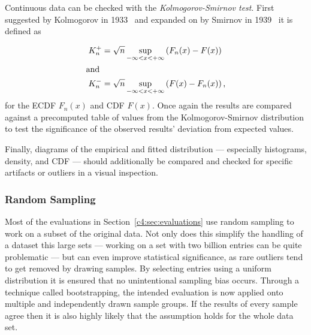 Continuous data can be checked with the \textit{Kolmogorov-Smirnov test}. First suggested by Kolmogorov in 1933~\cite{kolmogorov1933sulla} and expanded on by Smirnov in 1939~\cite{smirnov1939estimation} it is defined as

\begin{align}
	K_n^+ &= \sqrt{n} \sup_{-\infty < x < + \infty} \left( F_n(x) - F(x) \right) \\
	\shortintertext{and}
	\phantom{,}K_n^- &= \sqrt{n} \sup_{-\infty < x < + \infty} \left( F(x) - F_n(x) \right)\text{,}
\end{align}
%
for the \gls{ECDF} $F_n(x)$ and \gls{CDF} $F(x)$. Once again the results are compared against a precomputed table of values from the Kolmogorov-Smirnov distribution to test the significance of the observed results' deviation from expected values. 

Finally, diagrams of the empirical and fitted distribution --- especially histograms, density, and \gls{CDF} --- should additionally be compared and checked for specific artifacts or outliers in a visual inspection. 



\subsubsection{Random Sampling}

Most of the evaluations in Section~\ref{c4:sec:evaluations} use random sampling to work on a subset of the original data.  Not only does this simplify the handling of a dataset this large sets --- working on a set with two billion entries can be quite problematic --- but can even improve statistical significance, as rare outliers tend to get removed by drawing samples. By selecting entries using a uniform distribution it is ensured that no unintentional sampling bias occurs. Through a technique called bootstrapping, the intended evaluation is now applied onto multiple and independently drawn sample groups. If the results of every sample agree then it is also highly likely that the assumption holds for the whole data set.






